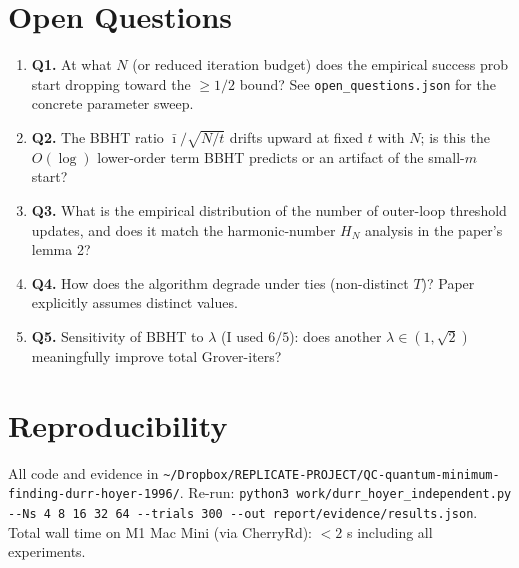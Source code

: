\documentclass[11pt]{article}
\begin{document}
\section{Open Questions}

\begin{enumerate}
    \item \textbf{Q1.} At what $N$ (or reduced iteration budget) does the
    empirical success prob start dropping toward the $\geq 1/2$ bound? See
    \verb|open_questions.json| for the concrete parameter sweep.
    \item \textbf{Q2.} The BBHT ratio $\bar\imath / \sqrt{N/t}$ drifts upward at
    fixed $t$ with $N$; is this the $O(\log)$ lower-order term BBHT predicts or
    an artifact of the small-$m$ start?
    \item \textbf{Q3.} What is the empirical distribution of the number of
    outer-loop threshold updates, and does it match the harmonic-number
    $H_N$ analysis in the paper's lemma 2?
    \item \textbf{Q4.} How does the algorithm degrade under ties (non-distinct
    $T$)? Paper explicitly assumes distinct values.
    \item \textbf{Q5.} Sensitivity of BBHT to $\lambda$ (I used $6/5$): does
    another $\lambda \in (1, \sqrt{2})$ meaningfully improve total Grover-iters?
\end{enumerate}

\section{Reproducibility}

All code and evidence in \verb|~/Dropbox/REPLICATE-PROJECT/QC-quantum-minimum-finding-durr-hoyer-1996/|.
Re-run: \verb|python3 work/durr_hoyer_independent.py --Ns 4 8 16 32 64 --trials 300 --out report/evidence/results.json|.
Total wall time on M1 Mac Mini (via CherryRd): $< 2$ s including all experiments.
\end{document}
